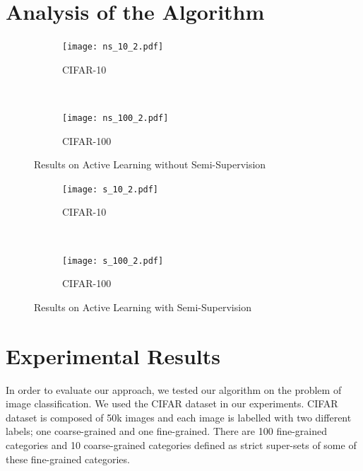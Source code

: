 \documentclass{article}
\begin{document}
\section{Analysis of the Algorithm}
\label{sec:analysis}


\begin{figure}[ht]
    \centering
    \begin{subfigure}[b]{0.48\textwidth}
        \texttt{[image: ns\_10\_2.pdf]}
        \caption{CIFAR-10}
    \end{subfigure}
    ~ %
    \begin{subfigure}[b]{0.48\textwidth}
        \texttt{[image: ns\_100\_2.pdf]}
        \caption{CIFAR-100}
    \end{subfigure}%
    \vspace{-3mm}
    \caption{Results on Active Learning without Semi-Supervision}\label{fig:resnosemi}
        \vspace{-3mm}
    \label{fig:resns}
   \vspace{5mm}

    \begin{subfigure}[b]{0.48\textwidth}
        \texttt{[image: s\_10\_2.pdf]}
        \caption{CIFAR-10}
    \end{subfigure}
    ~ %
    \begin{subfigure}[b]{0.48\textwidth}
        \texttt{[image: s\_100\_2.pdf]}
        \caption{CIFAR-100}
    \end{subfigure}%
        \vspace{-3mm}
    \caption{Results on Active Learning with Semi-Supervision}\label{fig:ressemi}
        \vspace{-3mm}
    \label{fig:ress}
\end{figure}

\section{Experimental Results}
\label{sec:exp}

In order to evaluate our approach, we tested our algorithm on the problem of image classification. We used the CIFAR\cite{cifar} dataset in our experiments.  CIFAR\cite{cifar} dataset is composed of 50k images and each image is labelled with two different labels; one coarse-grained and one fine-grained. There are 100 fine-grained categories and 10 coarse-grained categories defined as strict super-sets of some of these fine-grained categories. 
\end{document}

